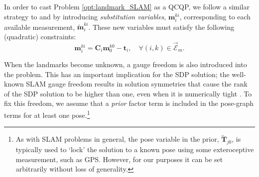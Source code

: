 \documentclass[lettersize,journal]{IEEEtran}
\newcommand{\EdgeSet}{\vec{\bm{\mathcal{E}}}}
\begin{document}
In order to cast Problem \eqref{opt:landmark_SLAM} as a QCQP, we follow a similar strategy to \cite{dumbgenSafeSmoothCertified2023} and \cite{brialesCertifiablyGloballyOptimal2018} by introducing \textit{substitution variables}, $ \bm{m}_i^{ki} $, corresponding to each available measurement, $ \tilde{\bm{m}}_i^{ki} $. These new variables must satisfy the following (quadratic) constraints:
\begin{equation}
	\bm{m}_i^{ki} = \bm{C}_i\bm{m}_0^{k0} - \bm{t}_i, \quad \forall (i,k)\in\EdgeSet_m.
\end{equation}

When the landmarks become unknown, a gauge freedom is also introduced into the problem. This has an important implication for the SDP solution; the well-known SLAM gauge freedom results in solution symmetries that cause the rank of the SDP solution to be higher than one, even when it is numerically tight \cite{brialesCertifiablyGloballyOptimal2018}. To fix this freedom, we assume that a \emph{prior} factor term is included in the pose-graph terms for at least one pose.\footnote{As with SLAM problems in general, the pose variable in the prior, $\tilde{\bm{T}}_{j0}$, is typically used to `lock' the solution to a known pose using some exteroceptive measurement, such as GPS. However, for our purposes it can be set arbitrarily without loss of generality.}
\end{document}
